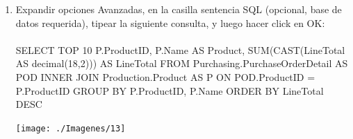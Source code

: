 \begin{enumerate}[1.]
	\clearpage
	
	\item Expandir opciones Avanzadas, en la casilla sentencia SQL (opcional, base de datos requerida), tipear la siguiente consulta, y luego hacer click en OK:
	\\
	\\SELECT TOP 10 P.ProductID, P.Name AS Product, SUM(CAST(LineTotal AS decimal(18,2))) AS LineTotal FROM 	Purchasing.PurchaseOrderDetail AS POD INNER JOIN Production.Product AS P ON POD.ProductID = P.ProductID GROUP BY P.ProductID, P.Name ORDER BY LineTotal DESC

	\begin{center}
	\texttt{[image: ./Imagenes/13]} 
	\end{center}

\end{enumerate}




